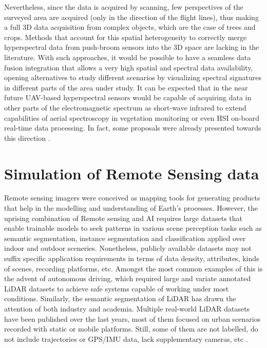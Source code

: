Nevertheless, since the data is acquired by scanning, few perspectives of the surveyed area are acquired (only in the direction of the flight lines), thus making a full 3D data acquisition from complex objects, which are the case of trees and crops. Methods that account for this spatial heterogeneity to correctly merge hyperspectral data from push-broom sensors into the 3D space are lacking in the literature. With such approaches, it would be possible to have a seamless data fusion integration that allows a very high spatial and spectral data availability, opening alternatives to study different scenarios by visualizing spectral signatures in different parts of the area under study. It can be expected that in the near future UAV-based hyperspectral sensors would be capable of acquiring data in other parts of the electromagnetic spectrum as short-wave infrared to extend capabilities of aerial spectroscopy in vegetation monitoring or even HSI on-board real-time data processing. In fact, some proposals were already presented towards this direction \cite{horstrand_uav_2019, saari_visible_2017}.

\section{Simulation of Remote Sensing data}

\gls{Remote sensing} imagers were conceived as mapping tools for generating products that help in the modelling and understanding of Earth's processes. However, the uprising combination of \gls{Remote sensing} and AI requires large datasets that enable trainable models to seek patterns in various scene perception tasks such as semantic segmentation, instance segmentation and classification applied over indoor and outdoor sceneries. Nonetheless, publicly available datasets may not suffix specific application requirements in terms of data density, attributes, kinds of scenes, recording platforms, etc. Amongst the most common examples of this is the advent of autonomous driving, which required large and variate annotated LiDAR datasets to achieve safe systems capable of working under most conditions. Similarly, the semantic segmentation of LiDAR has drawn the attention of both industry and academia. Multiple real-world LiDAR datasets have been published over the last years, most of them focused on urban scenarios recorded with static or mobile platforms. Still, some of them are not labelled, do not include trajectories or GPS/IMU data, lack supplementary cameras, etc \cite{cai_survey_2022}. 

